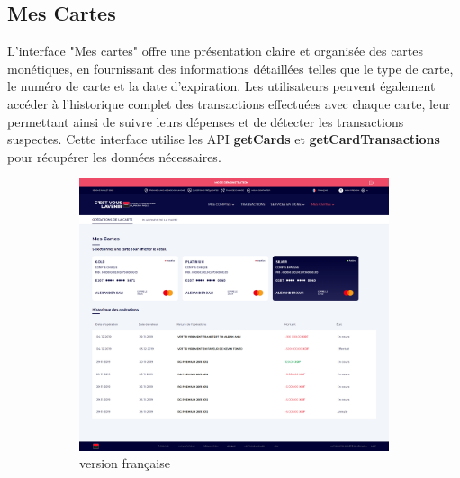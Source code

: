 \subsection{Mes Cartes}
L'interface "Mes cartes" offre une présentation claire et organisée des cartes monétiques, en fournissant des informations détaillées telles que le type de carte, le numéro de carte et la date d'expiration. Les utilisateurs peuvent également accéder à l'historique complet des transactions effectuées avec chaque carte, leur permettant ainsi de suivre leurs dépenses et de détecter les transactions suspectes. Cette interface utilise les API \textbf{getCards} et \textbf{getCardTransactions} pour récupérer les données nécessaires.
\begin{figure}[!ht]
    \centering
    \begin{subfigure}[b]{0.49\textwidth}
        \centering
        \includegraphics[width=\textwidth]{images/screens/cartes/desktop.png}
        \caption{version française}
    \end{subfigure}
    \hfill
    \begin{subfigure}[b]{0.49\textwidth}
        \centering

\end{subfigure}
\end{figure}
